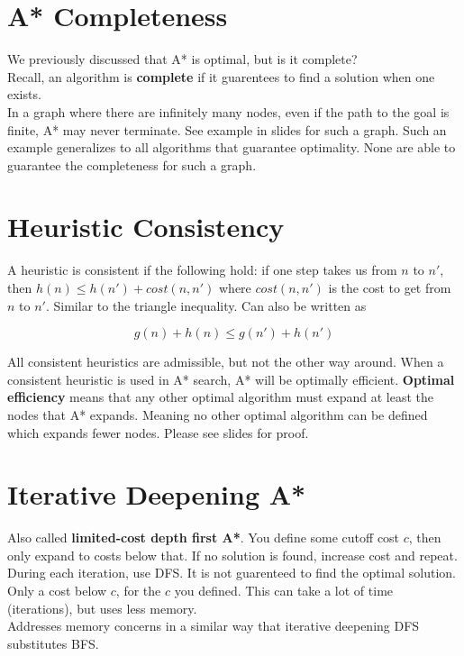 \documentclass[letterpaper]{article} %
\begin{document}
\section{A* Completeness}

We previously discussed that A* is optimal, but is it complete?\\

Recall, an algorithm is \textbf{complete} if it guarentees to find a solution when one exists.\\

In a graph where there are infinitely many nodes, even if the path to the goal is finite, A* may never terminate. See example in slides for such a graph. Such an example generalizes to all algorithms that guarantee optimality. None are able to guarantee the completeness for such a graph.

\section{Heuristic Consistency}

A heuristic is consistent if the following hold: if one step takes us from $n$ to $n'$, then $h(n) \leq h(n') + cost(n,n')$ where $cost(n,n')$ is the cost to get from $n$ to $n'$. Similar to the triangle inequality. Can also be written as

$$g(n) + h(n) \leq g(n') + h(n')$$

All consistent heuristics are admissible, but not the other way around. When a consistent heuristic is used in A* search, A* will be optimally efficient. \textbf{Optimal efficiency} means that any other optimal algorithm must expand at least the nodes that A* expands. Meaning no other optimal algorithm can be defined which expands fewer nodes. Please see slides for proof.

\section{Iterative Deepening A*}

Also called \textbf{limited-cost depth first A*}. You define some cutoff cost $c$, then only expand to costs below that. If no solution is found, increase cost and repeat. During each iteration, use DFS. It is not guarenteed to find the optimal solution. Only a cost below $c$, for the $c$ you defined. This can take a lot of time (iterations), but uses less memory.\\

Addresses memory concerns in a similar way that iterative deepening DFS substitutes BFS.
\end{document}
